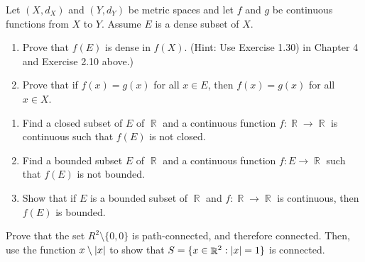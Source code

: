 \documentclass[12pt,letterpaper,boxed]{hmcpset}
\DeclareMathOperator{\R}{\mathbb{R}}
\DeclarePairedDelimiter\abs{\lvert}{\rvert}%
\begin{document}
\begin{solution}

\end{solution}

\begin{problem}[Exercise 2.11]
Let $(X, d_X)$ and $(Y, d_Y)$ be metric spaces and let $f$ and $g$ be continuous functions from $X$ to $Y$. Assume $E$ is a dense subset of $X$.
\vspace{-2mm}
\begin{enumerate}
    \itemsep0em
    \item Prove that $f(E)$ is dense in $f(X).$ (Hint: Use Exercise 1.30) in Chapter 4 and Exercise 2.10 above.)
    \item Prove that if $f(x) = g(x)$ for all $x \in E$, then $f(x) = g(x)$ for all $x\in X$.
\end{enumerate} 
\end{problem}

\begin{solution}
 
\end{solution}

\begin{problem}[Exercise 2.23]
\begin{enumerate}
    \itemsep0em
    \item Find a closed subset of $E$ of $\R$ and a continuous function $f: \R \rightarrow \R$ is continuous such that $f(E)$ is not closed.
    \item Find a bounded subset $E$ of $\R$ and a continuous function $f : E \rightarrow \R$ such that $f(E)$ is not bounded.
    \item Show that if $E$ is a bounded subset of $\R$ and $f: \R \rightarrow \R$ is continuous, then $f(E)$ is bounded.
\end{enumerate} 
\end{problem}

\begin{solution}

\end{solution}

\begin{problem}[Exercise 2.32]
Prove that the set $R^{2}\setminus\{0,0\}$ is path-connected, and therefore connected. Then, use the function $x\setminus\abs{x}$ to show that $S = \{x\in\R^{2}:\abs{x} = 1\}$ is connected.
\end{problem}

\begin{solution}
 
\end{solution}
\end{document}
